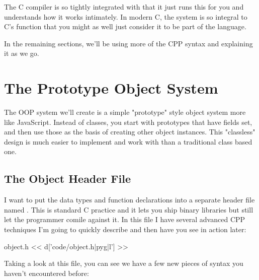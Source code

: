 The C compiler is so tightly integrated with  that it just
runs this for you and understands how it works intimately.  In modern C,
the  system is so integral to C's function that you might
as well just consider it to be part of the language.

In the remaining sections, we'll be using more of the CPP syntax and explaining
it as we go.


\section{The Prototype Object System}

The OOP system we'll create is a simple "prototype" style object system more
like JavaScript.  Instead of classes, you start with prototypes that have
fields set, and then use those as the basis of creating other object instances.
This "classless" design is much easier to implement and work with than a
traditional class based one.

\subsection{The Object Header File}

I want to put the data types and function declarations into a separate
header file named .  This is standard C practice and it
lets you ship binary libraries but still let the programmer comile against
it.  In this file I have several advanced CPP techniques I'm going to
quickly describe and then have you see in action later:

\begin{code}{object.h}
<< d['code/object.h|pyg|l'] >>
\end{code}

Taking a look at this file, you can see we have a few new pieces of 
syntax you haven't encountered before:

